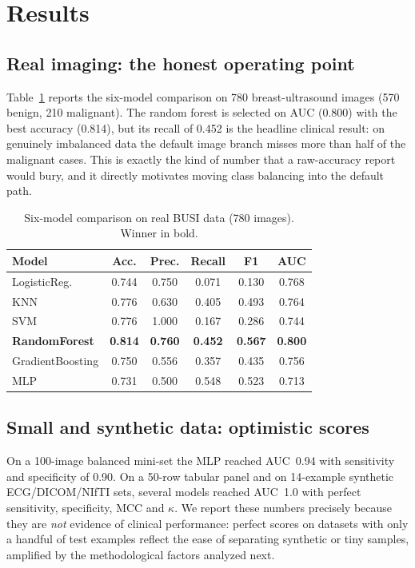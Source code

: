 \documentclass[10pt,twocolumn]{article}
\begin{document}
\section{Results}
\subsection{Real imaging: the honest operating point}
Table~\ref{tab:busi} reports the six-model comparison on 780 breast-ultrasound
images (570 benign, 210 malignant). The random forest is selected on AUC
(0.800) with the best accuracy (0.814), but its recall of 0.452 is the headline
clinical result: on genuinely imbalanced data the default image branch misses
more than half of the malignant cases. This is exactly the kind of number that a
raw-accuracy report would bury, and it directly motivates moving class balancing
into the default path.

\begin{table}[t]
\centering
\caption{Six-model comparison on real BUSI data (780 images). Winner in bold.}
\label{tab:busi}
\small
\begin{tabular}{@{}lccccc@{}}
\toprule
Model & Acc. & Prec. & Recall & F1 & AUC \\
\midrule
LogisticReg.      & 0.744 & 0.750 & 0.071 & 0.130 & 0.768 \\
KNN               & 0.776 & 0.630 & 0.405 & 0.493 & 0.764 \\
SVM               & 0.776 & 1.000 & 0.167 & 0.286 & 0.744 \\
\textbf{RandomForest} & \textbf{0.814} & \textbf{0.760} & \textbf{0.452} & \textbf{0.567} & \textbf{0.800} \\
GradientBoosting  & 0.750 & 0.556 & 0.357 & 0.435 & 0.756 \\
MLP               & 0.731 & 0.500 & 0.548 & 0.523 & 0.713 \\
\bottomrule
\end{tabular}
\end{table}

\subsection{Small and synthetic data: optimistic scores}
On a 100-image balanced mini-set the MLP reached AUC~0.94 with sensitivity and
specificity of 0.90. On a 50-row tabular panel and on 14-example synthetic
ECG/DICOM/NIfTI sets, several models reached AUC~1.0 with perfect sensitivity,
specificity, MCC and $\kappa$. We report these numbers precisely because they
are \emph{not} evidence of clinical performance: perfect scores on datasets with
only a handful of test examples reflect the ease of separating synthetic or
tiny samples, amplified by the methodological factors analyzed next.
\end{document}
